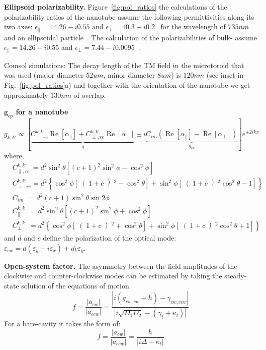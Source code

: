 \documentclass[journal=jacsat,manuscript=article]{achemso}
\begin{document}
\begin{suppinfo}
\textbf{Ellipsoid polarizability.} Figure~\ref{fig:pol_ratios} the calculations of the polarizability ratios of the nanotube assume the following permittivities along its two axes: $\epsilon_{||}=14.26-i0.55$ and $\epsilon_{\perp}=10.3-i0.2$~\cite{taverna2002,kociak2001experimental} for the wavelength of $735nm$ and an ellipsoidal particle~\cite{hulst1957light}. The calculation of the polarizabilities of bulk- assume $\epsilon_{||}=14.26-i0.55$ and $\epsilon_{\perp}=7.44-i0.0095$~\cite{taverna2002}.

Comsol simulations: The decay length of the TM field in the microtoroid that was used (major diameter $52um$, minor diameter $8um$) is $120nm$  (see inset in Fig.~\ref{fig:pol_ratios}a) and together with the orientation of the nanotube we get approximately $130nm$ of overlap.

\textbf{$\mathbf{g}_{cp}$ for a nanotube}
\begin{equation*}
g_{k,k'} \propto \left[ \underbrace{C_{\parallel,re}^{k,k'} \operatorname{Re} \left[ \alpha_{\parallel} \right] + C_{\perp,re}^{k,k'} \operatorname{Re} \left[ \alpha_{\perp} \right]}_{g} \pm i \underbrace{C_{im} \left( \operatorname{Re} \left[ \alpha_{\parallel} \right] - \operatorname{Re} \left[ \alpha_{\perp} \right] \right)}_{g_{cp}} \right] e^{\pm 2 i k x} 
\end{equation*}
where,
\begin{align*}
&C_{\parallel,re}^{k,k'} \,= d^2 \sin^2{\theta} \left[(c+1)^2 \sin^2{\phi} - \cos^2{\phi}\right]\\
&C_{\perp,re}^{k,k'} = d^2 \left\{ \cos^2{\phi} \left[ \right( 1 + c \left)^2 - \cos^2{\theta} \right] + \sin^2{\phi} \left[ \right( 1 + c \left)^2 \cos^2{\theta} - 1 \right] \right\}\\
&C_{im} \ \: = d^2(c+1) \sin^2{\theta} \sin{2\phi}\\
&C_{\parallel}^{k,k} \;\:\! = d^2 \sin^2{\theta} \left[(c+1)^2 \sin^2{\phi} + \cos^2{\phi}\right]\\
&C_{\perp}^{k,k} \;\:\! = d^2 \left\{ \cos^2{\phi} \left[ \right( 1 + c \left)^2 + \cos^2{\theta} \right] + \sin^2{\phi} \left[ \right( 1 + c \left)^2 \cos^2{\theta} + 1 \right] \right\}
\end{align*}
and $d$ and $c$ define the polarization of the optical mode: $\varepsilon_{cw} = d \left(\varepsilon_y + i \varepsilon_x \right) +dc\varepsilon_y$.

\textbf{Open-system factor.} The asymmetry between the field amplitudes of the clockwise and counter-clockwise modes can be estimated by taking the steady-state solution of the equations of motion.
\begin{equation*}
f = \frac{\left| a_{cw} \right|}{\left| a_{ccw} \right|} =  \frac{\left| i\left( g_{cw,cw} + h\right) - \gamma_{cw,ccw}\right|}{\left| i \sqrt{D_1 D_2} - \left( \gamma_t + \kappa_t \right) \right|} 
\end{equation*}
For a bare-cavity it takes the form of:
\begin{equation*}
f = \frac{\left| a_{cw} \right|}{\left| a_{ccw} \right|} =  \frac{h}{\left| i \Delta - \kappa_t \right|} 
\end{equation*}


\end{suppinfo}
\end{document}
